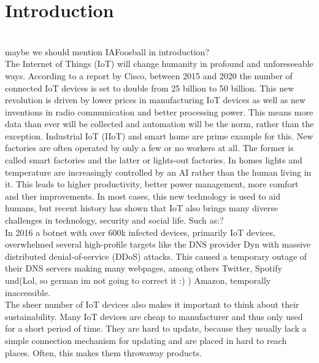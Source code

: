 \section{Introduction}
\\
maybe we should mention IAFoosball in introduction?
\\
The Internet of Things (IoT) will change humanity in profound and unforeseeable ways\cite{ciscoReport}. According to a report by Cisco, between 2015 and 2020 the number of connected IoT devices is set to double from 25 billion to 50 billion\cite{ciscoReport}. This new revolution is driven by lower prices in manufacturing IoT devices as well as new inventions in radio communication and better processing power. This means more data than ever will be collected and automation will be the norm, rather than the exception. Industrial IoT (IIoT) and smart home are prime example for this. New factories are often operated by only a few or no workers at all. The former is called smart factories and the latter or lights-out factories\cite{smartVSLightoutFactories:online}. In homes lights and temperature are increasingly controlled by an AI rather than the human living in it. This leads to higher productivity, better power management, more comfort and ther improvements. In most cases, this new technology is used to aid humans, but recent history has shown that IoT also brings many diverse challenges in technology, security and social life. Such as:?\\

In 2016 a botnet with over 600k infected devices, primarily IoT devices, overwhelmed several high-profile targets like the DNS provider Dyn with massive distributed denial-of-service (DDoS) attacks. This caused a temporary outage of their DNS servers making many webpages, among others  Twitter, Spotify und(Lol, so german im not going to correct it :) ) Amazon, temporally inaccessible.\\

The sheer number of IoT devices also makes it important to think about their sustainability. Many IoT devices are cheap to manufacturer and thus only used for a short period of time. They are hard to update, because they usually lack a simple connection mechanism for updating and are placed in hard to reach places. Often, this makes them throwaway products.\\

